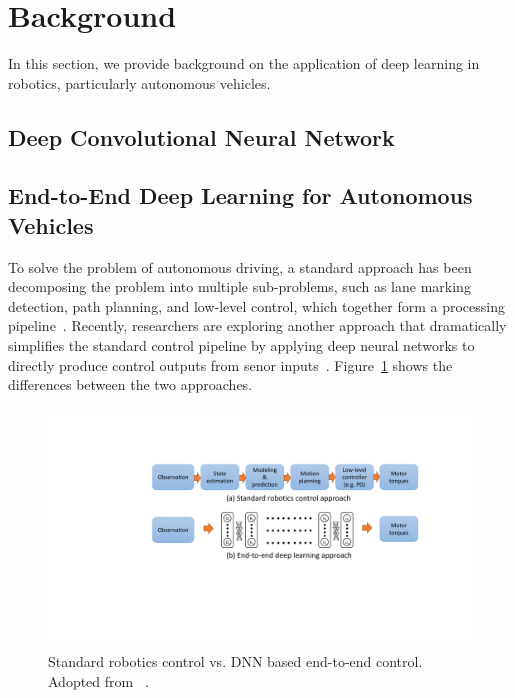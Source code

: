 \section{Background} \label{sec:background}

In this section, we provide background on the application of deep
learning in robotics, particularly autonomous vehicles. 

\subsection{Deep Convolutional Neural Network}

\subsection{End-to-End Deep Learning for Autonomous Vehicles}


To solve the problem of autonomous driving, a standard approach has
been decomposing the problem into multiple sub-problems,
such as lane marking detection, path planning, and low-level
control, which together form a processing pipeline~\cite{Bojarski2016}.
Recently, researchers are exploring another approach that dramatically
simplifies the standard control pipeline by applying deep neural
networks to directly produce control outputs from senor
inputs~\cite{Levine2016}. Figure~\ref{fig:end-to-end-control}
shows the differences between the two approaches.

\begin{figure}[h]
  \centering
  \includegraphics[width=.75\textwidth]{figs/endtoend_redrawn}
  \caption{Standard robotics control vs. DNN based end-to-end
    control. Adopted from ~\cite{Levine2017cs294}.}
  \label{fig:end-to-end-control}
\end{figure}

